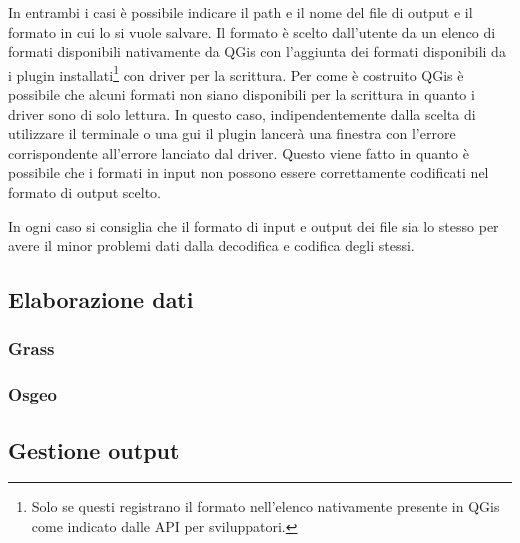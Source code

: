 In entrambi i casi è possibile indicare il path e il nome del file di output e il formato in cui lo si vuole salvare.
Il formato è scelto dall'utente da un elenco di formati disponibili nativamente da QGis con l'aggiunta dei formati disponibili da i plugin installati\footnote{Solo se questi registrano il formato nell'elenco nativamente presente in QGis come indicato dalle API per sviluppatori.} con driver per la scrittura. Per come è costruito QGis è possibile che alcuni formati non siano disponibili per la scrittura in quanto i driver sono di solo lettura. In questo caso, indipendentemente dalla scelta di utilizzare il terminale o una gui il plugin lancerà una finestra con l'errore corrispondente all'errore lanciato dal driver. Questo viene fatto in quanto è possibile che i formati in input non possono essere correttamente codificati nel formato di output scelto.

In ogni caso si consiglia che il formato di input e output dei file sia lo stesso per avere il minor problemi dati dalla decodifica e codifica degli stessi. 

\subsection{Elaborazione dati}
\subsubsection{Grass}
\subsubsection{Osgeo}
\subsection{Gestione output}